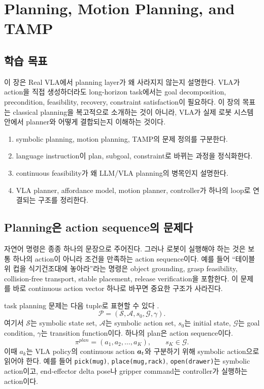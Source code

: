 \chapter{Planning, Motion Planning, and TAMP}

\section*{학습 목표}

이 장은 Real VLA에서 planning layer가 왜 사라지지 않는지 설명한다. VLA가 action을 직접 생성하더라도 long-horizon task에서는 goal decomposition, precondition, feasibility, recovery, constraint satisfaction이 필요하다. 이 장의 목표는 classical planning을 복고적으로 소개하는 것이 아니라, VLA가 실제 로봇 시스템 안에서 planner와 어떻게 결합되는지 이해하는 것이다.

\begin{enumerate}
  \item symbolic planning, motion planning, TAMP의 문제 정의를 구분한다.
  \item language instruction이 plan, subgoal, constraint로 바뀌는 과정을 정식화한다.
  \item continuous feasibility가 왜 LLM/VLA planning의 병목인지 설명한다.
  \item VLA planner, affordance model, motion planner, controller가 하나의 loop로 연결되는 구조를 정리한다.
\end{enumerate}

\section{Planning은 action sequence의 문제다}

자연어 명령은 종종 하나의 문장으로 주어진다. 그러나 로봇이 실행해야 하는 것은 보통 하나의 action이 아니라 조건을 만족하는 action sequence이다. 예를 들어 ``테이블 위 컵을 식기건조대에 놓아라''라는 명령은 object grounding, grasp feasibility, collision-free transport, stable placement, release verification을 포함한다. 이 문제를 바로 continuous action vector 하나로 바꾸면 중요한 구조가 사라진다.

task planning 문제는 다음 tuple로 표현할 수 있다 \cite{lavalle2006,kaelbling2011tamp}.
\begin{equation}
  \mathcal{P}
  =
  (\mathcal{S},\mathcal{A},s_0,\mathcal{G},\gamma).
  \label{eq:planning-problem}
\end{equation}
여기서 $\mathcal{S}$는 symbolic state set, $\mathcal{A}$는 symbolic action set, $s_0$는 initial state, $\mathcal{G}$는 goal condition, $\gamma$는 transition function이다. 하나의 plan은 action sequence이다.
\begin{equation}
  \pi^{plan}
  =
  (a_1,a_2,\ldots,a_K),
  \qquad
  s_K \in \mathcal{G}.
  \label{eq:plan-sequence}
\end{equation}
이때 $a_k$는 VLA policy의 continuous action $\bm{a}_t$와 구분하기 위해 symbolic action으로 읽어야 한다. 예를 들어 \texttt{pick(mug)}, \texttt{place(mug,rack)}, \texttt{open(drawer)}는 symbolic action이고, end-effector delta pose나 gripper command는 controller가 실행하는 action이다.

